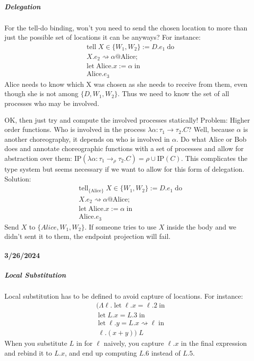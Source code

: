 \documentclass{article}
\theoremstyle{definition}
\begin{document}
\subparagraph{Delegation}
For the tell-do binding, won't you need to send the chosen location to more than just the possible set of locations it can be anyways? For instance:
\begin{align*}
	&\text{tell}\; X \in \{W_1,W_2\} := D.e_1 \;\text{do}\\
	&X.e_2 \rightsquigarrow \alpha @ \text{Alice};\\
	&\text{let}\; \text{Alice}.x := \alpha \;\text{in}\\
	&\text{Alice}.e_3
\end{align*}
Alice needs to know which X was chosen as she needs to receive from them, even though she is not among $\{D,W_1,W_2\}$. Thus we need to know the set of all processes who may be involved.

OK, then just try and compute the involved processes statically! Problem: Higher order functions. Who is involved in the process $\lambda \alpha : \tau_1 \rightarrow \tau_2.C$? Well, because $\alpha$ is another choreography, it depends on who is involved in $\alpha$. Do what Alice or Bob does and annotate choreographic functions with a set of processes and allow for abstraction over them: $\text{IP}(\lambda \alpha : \tau_1 \rightarrow_\rho \tau_2.C) = \rho \cup \text{IP}(C)$. This complicates the type system but seems necessary if we want to allow for this form of delegation.
Solution:
\begin{align*}
	&\text{tell}_{\{\text{Alice}\}}\; X \in \{W_1,W_2\} := D.e_1 \;\text{do}\\
	&X.e_2 \rightsquigarrow \alpha @ \text{Alice};\\
	&\text{let}\; \text{Alice}.x := \alpha \;\text{in}\\
	&\text{Alice}.e_3
\end{align*}
Send $X$ to $\{Alice, W_1, W_2\}$. If someone tries to use $X$ inside the body and we didn't sent it to them, the endpoint projection will fail.

\paragraph{3/26/2024}
\subparagraph{Local Substitution}
Local substitution has to be defined to avoid capture of locations. For instance:
\begin{align*}
&(\Lambda \ell. \;\text{let}\; \ell.x = \ell.2 \;\text{in}\\
&\;\text{let}\; L.x = L.3 \;\text{in}\\
&\;\text{let}\; \ell.y = L.x \rightsquigarrow \ell \;\text{in}\\
&\;\ell.(x + y))\; L
\end{align*}
When you substitute $L$ in for $\ell$ naively, you capture $\ell.x$ in the final expression and rebind it to $L.x$, and end up computing $L.6$ instead of $L.5$.
\end{document}
